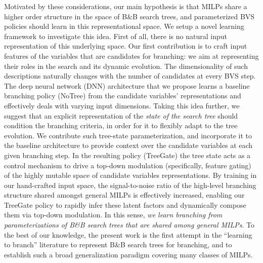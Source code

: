\documentclass[letterpaper]{article} %
\begin{document}
Motivated by these considerations, our main hypothesis is that MILPs share a higher order structure in the space of B\&B search trees, and parameterized BVS policies should learn in this representational space. 
We setup a novel learning framework to investigate this idea. First of all, there is no natural input representation of this underlying space. 
Our first contribution is to craft input features of the variables that are candidates for branching: we aim at representing their roles in the search and its dynamic evolution. 
The dimensionality of such descriptions naturally changes with the number of candidates at every BVS step. 
The deep neural network (DNN) architecture that we propose learns a baseline branching policy (NoTree) from the candidate variables' representations and effectively deals with varying input dimensions. 
Taking this idea further, we suggest that an explicit representation of the \emph{state of the search tree} should condition the branching criteria, in order for it to flexibly adapt to the tree evolution. 
We contribute such tree-state parameterization, and incorporate it to the baseline architecture to provide context over the candidate variables at each given branching step. 
In the resulting policy (TreeGate) the tree state acts as a control mechanism to drive a top-down modulation (specifically, feature gating) of the highly mutable space of candidate variables representations. 
By training in our hand-crafted input space, the signal-to-noise ratio of the high-level branching structure shared amongst general MILPs is effectively increased, enabling our TreeGate policy to rapidly infer these latent factors and dynamically compose them via top-down modulation. 
In this sense, \emph{we learn branching from parameterizations of B\&B search trees that are shared among general MILPs}.
To the best of our knowledge, the present work is the first attempt in the “learning to branch” literature to represent B\&B search trees for branching, and to establish such a broad generalization paradigm covering many classes of MILPs. 
\end{document}
